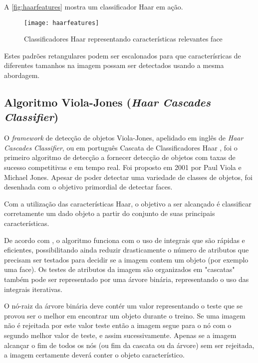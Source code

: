 A \autoref{fig:haarfeatures} mostra um classificador Haar em ação.

 \begin{figure}[h]
	\centering
	\texttt{[image: haarfeatures]}
	\caption{Classificadores Haar representando características relevantes face}
	\label{fig:haarfeatures}
\end{figure}

Estes padrões retangulares podem ser escalonados para que caracterísricas de diferentes tamanhos na imagem possam ser detectados usando a mesma abordagem.


\subsection{Algoritmo Viola-Jones (\textit{Haar Cascades Classifier}) }\label{subsubsec:violajones}

O \textit{framework} de detecção de objetos Viola-Jones, apelidado em inglês de \textit{Haar Cascades Classifier}, ou em português Cascata de Classificadores Haar \cite{gustavo_cascata}, foi o primeiro algoritmo de detecção a fornecer detecção de objetos com taxas de sucesso competitivas e em tempo real. Foi proposto em 2001 por Paul Viola e Michael Jones. Apesar de poder detectar uma variedade de classes de objetos, foi desenhada com o objetivo primordial de detectar faces.

Com a utilização das características Haar, o objetivo a ser alcançado é classificar corretamente um dado objeto a partir do conjunto de suas principais características. 

De acordo com \cite{drmathew_java_programming}, o algoritmo funciona com o uso de integrais que são rápidas e eficientes, possibilitando ainda reduzir drasticamente o número de atributos que precisam ser testados para decidir se a imagem contem um objeto (por exemplo uma face). Os testes de atributos da imagem são organizados em "cascatas" também pode ser representado por uma árvore binária, representando o uso das integrais iterativas.

O nó-raiz da árvore binária deve contér um valor representando o teste que se provou ser o melhor em encontrar um objeto durante o treino. Se uma imagem não é rejeitada por este valor teste então a imagem segue para o nó com o segundo melhor valor de teste, e assim sucessivamente. Apenas se a imagem alcançar o fim de todos os nós (ou fim da cascata ou da árvore) sem ser rejeitada, a imagem certamente deverá conter o objeto característico.

